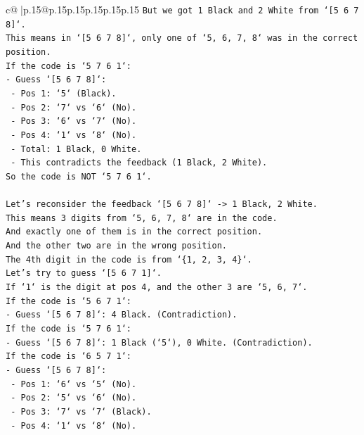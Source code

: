 \documentclass{article}
\begin{document}
{\begin{supertabular}{c@{$\;$}|p{.15\linewidth}@{}p{.15\linewidth}p{.15\linewidth}p{.15\linewidth}p{.15\linewidth}p{.15\linewidth}}
{{{\texttt{But we got 1 Black and 2 White from `{[}5 6 7 8{]}`.} \\
\texttt{This means in `{[}5 6 7 8{]}`, only one of `5, 6, 7, 8` was in the correct position.} \\
\texttt{If the code is `5 7 6 1`:} \\
\texttt{{-} Guess `{[}5 6 7 8{]}`:} \\
\texttt{  {-} Pos 1: `5` (Black).} \\
\texttt{  {-} Pos 2: `7` vs `6` (No).} \\
\texttt{  {-} Pos 3: `6` vs `7` (No).} \\
\texttt{  {-} Pos 4: `1` vs `8` (No).} \\
\texttt{  {-} Total: 1 Black, 0 White.} \\
\texttt{  {-} This contradicts the feedback (1 Black, 2 White).} \\
\texttt{So the code is NOT `5 7 6 1`.} \\
\\ 
\texttt{Let's reconsider the feedback `{[}5 6 7 8{]}` {-}> 1 Black, 2 White.} \\
\texttt{This means 3 digits from `5, 6, 7, 8` are in the code.} \\
\texttt{And exactly one of them is in the correct position.} \\
\texttt{And the other two are in the wrong position.} \\
\texttt{The 4th digit in the code is from `\{1, 2, 3, 4\}`.} \\
\texttt{Let's try to guess `{[}5 6 7 1{]}`.} \\
\texttt{If `1` is the digit at pos 4, and the other 3 are `5, 6, 7`.} \\
\texttt{If the code is `5 6 7 1`:} \\
\texttt{{-} Guess `{[}5 6 7 8{]}`: 4 Black. (Contradiction).} \\
\texttt{If the code is `5 7 6 1`:} \\
\texttt{{-} Guess `{[}5 6 7 8{]}`: 1 Black (`5`), 0 White. (Contradiction).} \\
\texttt{If the code is `6 5 7 1`:} \\
\texttt{{-} Guess `{[}5 6 7 8{]}`:} \\
\texttt{  {-} Pos 1: `6` vs `5` (No).} \\
\texttt{  {-} Pos 2: `5` vs `6` (No).} \\
\texttt{  {-} Pos 3: `7` vs `7` (Black).} \\
\texttt{  {-} Pos 4: `1` vs `8` (No).} \\
}}}
\end{supertabular}}
\end{document}
